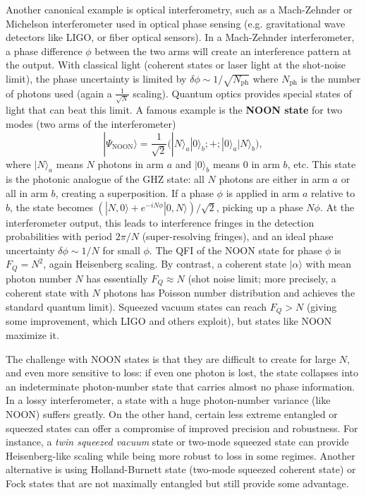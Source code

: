 Another canonical example is optical interferometry, such as a
Mach-Zehnder or Michelson interferometer used in optical phase sensing
(e.g. gravitational wave detectors like LIGO, or fiber optical
sensors). In a Mach-Zehnder interferometer, a phase difference $\phi$
between the two arms will create an interference pattern at the
output. With classical light (coherent states or laser light at the
shot-noise limit), the phase uncertainty is limited by $\delta \phi
\sim 1/\sqrt{N_{\text{ph}}}$ where $N_{\text{ph}}$ is the number of
photons used (again a $\frac{1}{\sqrt{N}}$ scaling). Quantum optics
provides special states of light that can beat this limit. A famous
example is the \textbf{NOON state} for two modes (two arms of the
interferometer)
\begin{equation}
|\Psi_{\text{NOON}}\rangle = \frac{1}{\sqrt{2}}\big(|N\rangle_a |0\rangle_b ;+; |0\rangle_a |N\rangle_b \big),
\label{eq:NOON}
\end{equation}
where $|N\rangle_a$ means $N$ photons in arm $a$ and $|0\rangle_b$
means 0 in arm $b$, etc. This state is the photonic analogue of the
GHZ state: all $N$ photons are either in arm $a$ or all in arm $b$,
creating a superposition. If a phase $\phi$ is applied in arm $a$
relative to $b$, the state becomes $(|N,0\rangle + e^{-i N
  \phi}|0,N\rangle)/\sqrt{2}$, picking up a phase $N\phi$. At the
interferometer output, this leads to interference fringes in the
detection probabilities with period $2\pi/N$ (super-resolving
fringes), and an ideal phase uncertainty $\delta\phi \sim 1/N$ for
small $\phi$. The QFI of the NOON state for phase $\phi$ is $F_Q =
N^2$, again Heisenberg scaling. By contrast, a coherent state
$|\alpha\rangle$ with mean photon number $N$ has essentially $F_Q
\approx N$ (shot noise limit; more precisely, a coherent state with
$N$ photons has Poisson number distribution and achieves the standard
quantum limit). Squeezed vacuum states can reach $F_Q > N$ (giving
some improvement, which LIGO and others exploit), but states like NOON
maximize it.



The challenge with NOON states is that they are difficult to create
for large $N$, and even more sensitive to loss: if even one photon is
lost, the state collapses into an indeterminate photon-number state
that carries almost no phase information. In a lossy interferometer, a
state with a huge photon-number variance (like NOON) suffers
greatly. On the other hand, certain less extreme entangled or squeezed
states can offer a compromise of improved precision and
robustness. For instance, a \emph{twin squeezed vacuum} state or
two-mode squeezed state can provide Heisenberg-like scaling while
being more robust to loss in some regimes. Another alternative is
using Holland-Burnett state (two-mode squeezed coherent state) or Fock
states that are not maximally entangled but still provide some
advantage.



